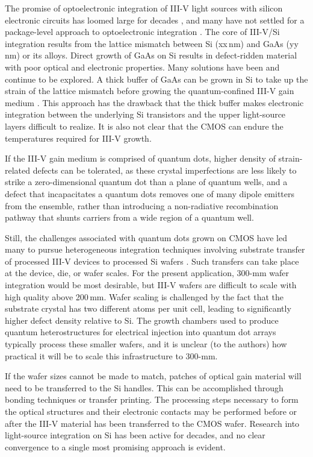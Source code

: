 \documentclass[twocolumn]{article}
\begin{document}
The promise of optoelectronic integration of III-V light sources with silicon electronic circuits has loomed large for decades \cite{}, and many have not settled for a package-level approach to optoelectronic integration \cite{}. The core of III-V/Si integration results from the lattice mismatch between Si (xx\,nm) and GaAs (yy\,nm) or its alloys. Direct growth of GaAs on Si results in defect-ridden material with poor optical and electronic properties. Many solutions have been and continue to be explored. A thick buffer of GaAs can be grown in Si to take up the strain of the lattice mismatch before growing the quantum-confined III-V gain medium \cite{}. This approach has the drawback that the thick buffer makes electronic integration between the underlying Si transistors and the upper light-source layers difficult to realize. It is also not clear that the CMOS can endure the temperatures required for III-V growth. 

If the III-V gain medium is comprised of quantum dots, higher density of strain-related defects can be tolerated, as these crystal imperfections are less likely to strike a zero-dimensional quantum dot than a plane of quantum wells, and a defect that incapacitates a quantum dots removes one of many dipole emitters from the ensemble, rather than introducing a non-radiative recombination pathway that shunts carriers from a wide region of a quantum well. 

Still, the challenges associated with quantum dots grown on CMOS have led many to pursue heterogeneous integration techniques involving substrate transfer of processed III-V devices to processed Si wafers \cite{}. Such transfers can take place at the device, die, or wafer scales. For the present application, 300-mm wafer integration would be most desirable, but III-V wafers are difficult to scale with high quality above 200\,mm. Wafer scaling is challenged by the fact that the substrate crystal has two different atoms per unit cell, leading to significantly higher defect density relative to Si. The growth chambers used to produce quantum heterostructures for electrical injection into quantum dot arrays typically process these smaller wafers, and it is unclear (to the authors) how practical it will be to scale this infrastructure to 300-mm. 

If the wafer sizes cannot be made to match, patches of optical gain material will need to be transferred to the Si handles. This can be accomplished through bonding techniques or transfer printing. The processing steps necessary to form the optical structures and their electronic contacts may be performed before or after the III-V material has been transferred to the CMOS wafer. Research into light-source integration on Si has been active for decades, and no clear convergence to a single most promising approach is evident.
\end{document}
